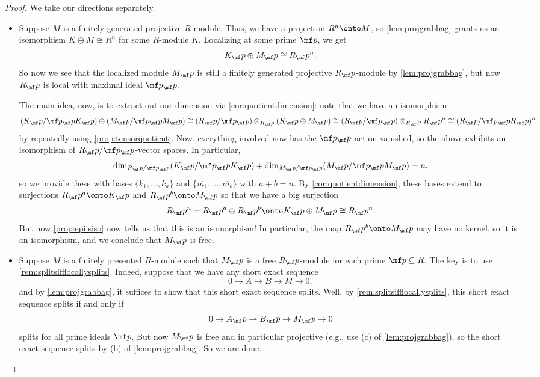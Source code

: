 \begin{proof}
	We take our directions separately.
	\begin{itemize}
		\item Suppose $M$ is a finitely generated projective $R$-module. Thus, we have a projection $R^n\onto M$, so \autoref{lem:projgrabbag} grants us an isomorphism $K\oplus M\cong R^n$ for some $R$-module $K$. Localizing at some prime $\mf p$, we get
		\[K_\mf p\oplus M_\mf p\cong R_\mf p^n.\]
		So now we see that the localized module $M_\mf p$ is still a finitely generated projective $R_\mf p$-module by \autoref{lem:projgrabbag}, but now $R_\mf p$ is local with maximal ideal $\mf p_\mf p$.
		
		The main idea, now, is to extract out our dimension via \autoref{cor:quotientdimension}: note that we have an isomorphism
		\[(K_\mf p/\mf p_\mf pK_\mf p)\oplus(M_\mf p/\mf p_\mf pM_\mf p)\cong(R_\mf p/\mf p_\mf p)\otimes_{R_\mf p}(K_\mf p\oplus M_\mf p)\cong(R_\mf p/\mf p_\mf p)\otimes_{R_\mf P}R_\mf p^n\cong(R_\mf p/\mf p_\mf pR_\mf p)^n\]
		by repeatedly using \autoref{prop:tensorquotient}. Now, everything involved now has the $\mf p_\mf p$-action vanished, so the above exhibits an isomorphism of $R_\mf p/\mf p_\mf p$-vector spaces. In particular,
		\[\dim_{R_\mf p/\mf p_\mf p}(K_\mf p/\mf p_\mf pK_\mf p)+\dim_{M_\mf p/\mf p_\mf p}(M_\mf p/\mf p_\mf pM_\mf p)=n,\]
		so we provide these with bases $\{\overline{k_1},\ldots,\overline{k_a}\}$ and $\{\overline{m_1},\ldots,\overline{m_b}\}$ with $a+b=n$. By \autoref{cor:quotientdimension}, these bases extend to surjections $R_\mf p^a\onto K_\mf p$ and $R_\mf p^b\onto M_\mf p$ so that we have a big surjection
		\[R_\mf p^n=R_\mf p^a\oplus R_\mf p^b\onto K_\mf p\oplus M_\mf p\cong R_\mf p^n.\]
		But now \autoref{prop:epiisiso} now tells us that this is an isomorphism! In particular, the map $R_\mf p^b\onto M_\mf p$ may have no kernel, so it is an isomorphism, and we conclude that $M_\mf p$ is free.

		\item Suppose $M$ is a finitely presented $R$-module such that $M_\mf p$ is a free $R_\mf p$-module for each prime $\mf p\subseteq R$. The key is to use \autoref{rem:splitsifflocallysplits}. Indeed, suppose that we have any short exact sequence
		\[0\to A\to B\to M\to 0,\]
		and by \autoref{lem:projgrabbag}, it suffices to show that this short exact sequence splits. Well, by \autoref{rem:splitsifflocallysplits}, this short exact sequence splits if and only if
		\[0\to A_\mf p\to B_\mf p\to M_\mf p\to 0\]
		splits for all prime ideals $\mf p$. But now $M_\mf p$ is free and in particular projective (e.g., use (c) of \autoref{lem:projgrabbag}), so the short exact sequence splits by (b) of \autoref{lem:projgrabbag}. So we are done.
		\qedhere
	\end{itemize}
\end{proof}
